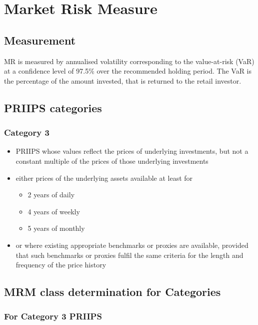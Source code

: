 \documentclass{report}
\begin{document}
	
\tableofcontents

\chapter{Market Risk Measure}

\section{Measurement}
MR is measured by annualised volatility corresponding to the value-at-risk (VaR) at a confidence level of 97.5\% over the recommended holding period. The VaR is the percentage of the amount invested, that is returned to the retail investor.

\section{PRIIPS categories}

\subsection{Category 3}
\begin{itemize}
	\item PRIIPS whose values reflect the prices of underlying investments, but not a constant multiple of the prices of those underlying investments
	\item either prices of the underlying assets available at least for
	\begin{itemize}
		\item 2 years of daily 
		\item 4 years of weekly
		\item 5 years of monthly
	\end{itemize}
	\item or where existing appropriate benchmarks or proxies are available, provided that such benchmarks or proxies fulfil the same criteria for the length and frequency of the price history 
\end{itemize}

\section{MRM class determination for Categories}

\subsection{For Category 3 PRIIPS}
\end{document}
